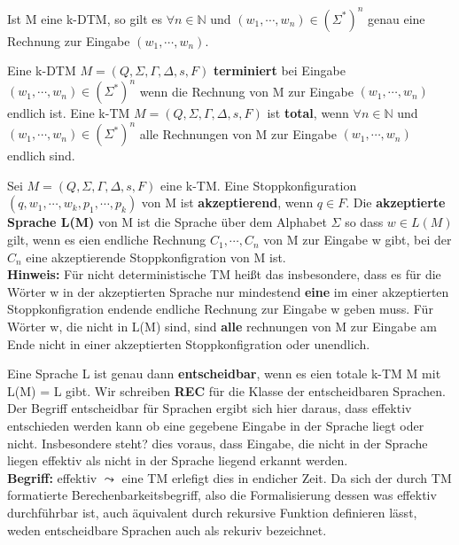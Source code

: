  Ist M eine k-DTM, so gilt es $\forall n \in \mathbb{N}$ und $(w_1, \cdots, w_n) \in (\Sigma^*)^n$ genau eine Rechnung zur Eingabe $(w_1, \cdots, w_n)$.

 Eine k-DTM $M = (Q, \Sigma, \Gamma, \Delta, s, F)$ \textbf{terminiert} bei Eingabe $(w_1, \cdots, w_n) \in (\Sigma^*)^n$ wenn die Rechnung von M zur Eingabe $(w_1, \cdots, w_n)$ endlich ist. Eine k-TM $M = (Q, \Sigma, \Gamma, \Delta, s, F)$ ist \textbf{total}, wenn $\forall n \in \mathbb{N}$ und $(w_1, \cdots, w_n) \in (\Sigma^*)^n$ alle Rechnungen von M zur Eingabe $(w_1, \cdots, w_n)$ endlich sind.

 Sei $M = (Q, \Sigma, \Gamma, \Delta, s, F)$ eine k-TM. Eine Stoppkonfiguration $(q, w_1, \cdots, w_k, p_1, \cdots, p_k)$ von M ist \textbf{akzeptierend}, wenn $q \in F$. Die \textbf{akzeptierte Sprache L(M)} von M ist die Sprache über dem Alphabet $\Sigma$ so dass $w\in L(M)$ gilt, wenn es eien endliche Rechnung $C_1, \cdots, C_n$ von M zur Eingabe w gibt, bei der $C_n$ eine akzeptierende Stoppkonfigration von M ist. \\ \textbf{Hinweis: } Für nicht deterministische TM heißt das insbesondere, dass es für die Wörter w in der akzeptierten Sprache nur mindestend \textbf{eine} im einer akzeptierten Stoppkonfigration endende endliche Rechnung zur Eingabe w geben muss. Für Wörter w, die nicht in L(M) sind, sind \textbf{alle} rechnungen von M zur Eingabe am Ende nicht in einer akzeptierten Stoppkonfigration oder unendlich.

Eine Sprache L ist genau dann \textbf{entscheidbar}, wenn es eien totale k-TM M mit L(M) = L gibt. Wir schreiben \textbf{REC} für die Klasse der entscheidbaren Sprachen. Der Begriff entscheidbar für Sprachen ergibt sich hier daraus, dass effektiv entschieden werden kann ob eine gegebene Eingabe in der Sprache liegt oder nicht. Insbesondere steht? dies voraus, dass Eingabe, die nicht in der Sprache liegen effektiv als nicht in der Sprache liegend erkannt werden. \\ \textbf{Begriff: } effektiv $\leadsto$ eine TM erlefigt dies in endicher Zeit. Da sich der durch TM formatierte Berechenbarkeitsbegriff, also die Formalisierung dessen was effektiv durchführbar ist, auch äquivalent durch rekursive Funktion definieren lässt, weden entscheidbare Sprachen auch als rekuriv bezeichnet.


